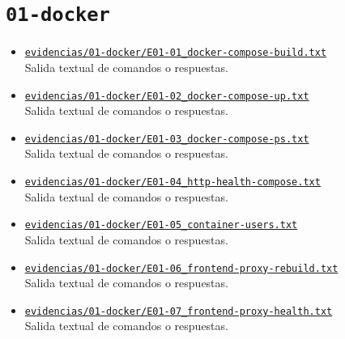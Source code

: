 \section{\texorpdfstring{\nolinkurl{01-docker}}{01-docker}}
\begin{itemize}[leftmargin=1.2em]
  \item \href{https://github.com/gamurigm/inventrack-ptes-report/blob/main/evidencias/01-docker/E01-01_docker-compose-build.txt}{\nolinkurl{evidencias/01-docker/E01-01_docker-compose-build.txt}}\\
  {\small Salida textual de comandos o respuestas.}
  \item \href{https://github.com/gamurigm/inventrack-ptes-report/blob/main/evidencias/01-docker/E01-02_docker-compose-up.txt}{\nolinkurl{evidencias/01-docker/E01-02_docker-compose-up.txt}}\\
  {\small Salida textual de comandos o respuestas.}
  \item \href{https://github.com/gamurigm/inventrack-ptes-report/blob/main/evidencias/01-docker/E01-03_docker-compose-ps.txt}{\nolinkurl{evidencias/01-docker/E01-03_docker-compose-ps.txt}}\\
  {\small Salida textual de comandos o respuestas.}
  \item \href{https://github.com/gamurigm/inventrack-ptes-report/blob/main/evidencias/01-docker/E01-04_http-health-compose.txt}{\nolinkurl{evidencias/01-docker/E01-04_http-health-compose.txt}}\\
  {\small Salida textual de comandos o respuestas.}
  \item \href{https://github.com/gamurigm/inventrack-ptes-report/blob/main/evidencias/01-docker/E01-05_container-users.txt}{\nolinkurl{evidencias/01-docker/E01-05_container-users.txt}}\\
  {\small Salida textual de comandos o respuestas.}
  \item \href{https://github.com/gamurigm/inventrack-ptes-report/blob/main/evidencias/01-docker/E01-06_frontend-proxy-rebuild.txt}{\nolinkurl{evidencias/01-docker/E01-06_frontend-proxy-rebuild.txt}}\\
  {\small Salida textual de comandos o respuestas.}
  \item \href{https://github.com/gamurigm/inventrack-ptes-report/blob/main/evidencias/01-docker/E01-07_frontend-proxy-health.txt}{\nolinkurl{evidencias/01-docker/E01-07_frontend-proxy-health.txt}}\\
  {\small Salida textual de comandos o respuestas.}
\end{itemize}

